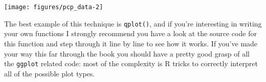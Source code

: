 \texttt{[image: figures/pcp\_data-2]}

The best example of this technique is \texttt{qplot()}, and if you're
interesting in writing your own functions I strongly recommend you have
a look at the source code for this function and step through it line by
line to see how it works. If you've made your way this far through the
book you should have a pretty good grasp of all the \texttt{ggplot}
related code: most of the complexity is R tricks to correctly interpret
all of the possible plot types.
